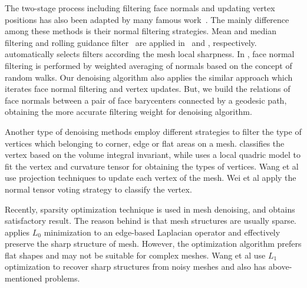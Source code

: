 The two-stage process including filtering face normals and updating vertex positions has also been adapted by many famous work~\cite{yagou2002mesh, chen2005sharpness, sun2008random, Wang2015rolling}.
The mainly difference among these methods is their normal filtering strategies.
Mean and median filtering and rolling guidance filter~\cite{Zhang2014rolling} are applied in~\cite{yagou2002mesh} and \cite{Wang2015rolling}, respectively.
\cite{chen2005sharpness} automatically selects filters according the mesh local sharpness.
In \cite{sun2008random}, face normal filtering is performed by weighted averaging of normals based on the concept of random walks.
Our denoising algorithm also applies the similar approach which iterates face normal filtering and vertex updates.
But, we build the relations of face normals between a pair of face barycenters connected by a geodesic path, obtaining the more accurate filtering weight for denoising algorithm.

Another type of denoising methods employ different strategies to filter the type of vertices which belonging to corner, edge or flat areas on a mesh.
\cite{bian2011feature} classifies the vertex based on the volume integral invariant,
while \cite{fan2010robust} uses a local quadric model to fit the vertex and curvature tensor for obtaining the types of vertices.
Wang et al \cite{wang2012cascaded} use projection techniques to update each vertex of the mesh.
Wei et al \cite{wei2015bi} apply the normal tensor voting strategy to classify the vertex. 


Recently, sparsity optimization technique is used in mesh denoising, and obtains satisfactory result.
The reason behind is that mesh structures are usually sparse.
\cite{he2013mesh} applies $L_0$ minimization to an edge-based Laplacian operator and effectively preserve the sharp structure of mesh.
However, the optimization algorithm prefers flat shapes and may not be suitable for complex meshes.
Wang et al \cite{Wang2014decoupling} use $L_1$ optimization to recover sharp structures from noisy meshes and also has above-mentioned problems.






